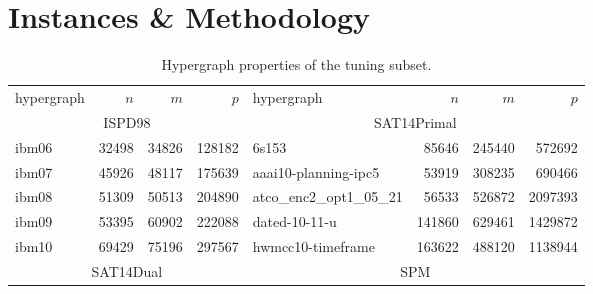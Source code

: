 \documentclass[a4paper,12pt,titlepage, BCOR7mm,headsepline]{scrbook}
\numberwithin{equation}{section}
\begin{document}
\section{Instances \& Methodology}
\label{sec:methodology}
\begin{table}[H]
        \caption{Hypergraph properties of the tuning subset.}
\label{tbl:instancessmall}

\centering
\begin{adjustbox}{max width=\textwidth}
\begin{tabular}{lrrr||l|rrr}
hypergraph & $n$& $m$ & $p$ & hypergraph & $n$ & $m$ & $p$\\
                         \cline{1-4}
                         \cline{5-8}
                         \cline{5-8}
                         \cline{1-4}
                         \cline{1-4}
                         \multicolumn{4}{c||}{ISPD98}          & \multicolumn{4}{c}{SAT14Primal} \\
                         \cline{5-8}
                         \cline{5-8}
                         \cline{1-4}
                         \cline{1-4}

                         ibm06                                 & 32498   & 34826  & 128182 & 6s153                                                & 85646   & 245440 & 572692            \\
                         ibm07                                 & 45926   & 48117  & 175639& aaai10-planning-ipc5              & 53919   & 308235 & 690466   \\
                         ibm08                                 & 51309   & 50513  & 204890& atco\_enc2\_opt1\_05\_21                             & 56533   & 526872 & 2097393  \\
                         ibm09                                 & 53395   & 60902  & 222088& dated-10-11-u                                        & 141860  & 629461 & 1429872  \\
                         ibm10                                 & 69429   & 75196  & 297567& hwmcc10-timeframe & 163622  & 488120 & 1138944  \\
                         \cline{1-4}
                         \cline{1-4}
                         \cline{5-8}
                         \cline{5-8}
                         \multicolumn{4}{c||}{SAT14Dual} & \multicolumn{4}{c}{SPM} \\
                         \cline{5-8}
                         \cline{5-8}
                         \cline{1-4}
                         \cline{1-4}


\end{tabular}
\end{adjustbox}
\end{table}
\end{document}
